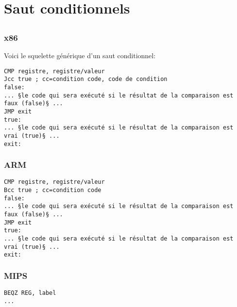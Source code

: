 \section{Saut conditionnels}
\label{sec:Jcc}






\subsection{\Conclusion{}}

\subsubsection{x86}

Voici le squelette générique d'un saut conditionnel:

\begin{lstlisting}[caption=x86,style=customasmx86]
CMP registre, registre/valeur
Jcc true ; cc=condition code, code de condition
false:
... §le code qui sera exécuté si le résultat de la comparaison est faux (false)§ ...
JMP exit 
true:
... §le code qui sera exécuté si le résultat de la comparaison est vrai (true)§ ...
exit:
\end{lstlisting}

\subsubsection{ARM}

\begin{lstlisting}[caption=ARM,style=customasmARM]
CMP registre, registre/valeur
Bcc true ; cc=condition code
false:
... §le code qui sera exécuté si le résultat de la comparaison est faux (false)§ ...
JMP exit 
true:
... §le code qui sera exécuté si le résultat de la comparaison est vrai (true)§ ...
exit:
\end{lstlisting}

\subsubsection{MIPS}

\begin{lstlisting}[caption=§Check si zéro§ (Branch if EQual Zero),style=customasmMIPS]
BEQZ REG, label
...
\end{lstlisting}

